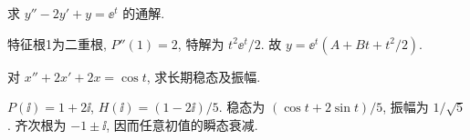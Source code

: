 \begin{exercise}求 $y''-2y'+y=\ee^t$ 的通解.\end{exercise}
\begin{solution}特征根1为二重根, $P''(1)=2$, 特解为 $t^2\ee^t/2$. 故 $y=\ee^t(A+Bt+t^2/2)$.\end{solution}
\begin{exercise}对 $x''+2x'+2x=\cos t$, 求长期稳态及振幅.\end{exercise}
\begin{solution}$P(\ii)=1+2\ii$, $H(\ii)=(1-2\ii)/5$. 稳态为 $(\cos t+2\sin t)/5$, 振幅为 $1/\sqrt5$. 齐次根为 $-1\pm\ii$, 因而任意初值的瞬态衰减.\end{solution}
